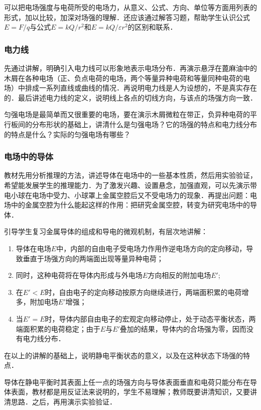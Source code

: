 可以把电场强度与电荷所受的电场力，从意义、公式、方向、单位等方面用列表的形式，加以比较，加深对场强的理解．还应该通过解答习题，帮助学生认识公式$E=F/q$与公式$E=kQ/r^2$和$E=kQ/\varepsilon r^2$的区别和联系．

\subsubsection{电力线}

先通过讲解，明确引入电力线可以形象地表示电场分布．再演示悬浮在蓖麻油中的木屑在各种电场（正、负点电荷的电场，两个等量异种电荷和等量同种电荷的电场）中排成一系列直线或曲线的情况．再说明电力线是人为设想的，不是真实存在的．最后讲述电力线的定义，说明线上各点的切线方向，与该点的场强方向一致．

匀强电场是最简单而又很重要的电场，要在演示木屑微粒在带正，负异种电荷的平行板间的分布形状的基础上，讲清什么是匀强电场？它的场强的特点和电力线分布的特点是什么？实际的匀强电场有哪些？

\subsubsection{电场中的导体}

教材先用分析推理的方法，讲述导体在电场中的一些基本性质，然后用实验验证，希望能发展学生的推理能力．为了激发兴趣、设置悬念，加强直观，可以先演示带电小球在电场中受力、小球罩上金属空腔后又不受电场力的现象．再提出问题：电场中的金属空腔为什么能起这样的作用：把研究金属空腔，转变为研究电场中的导体．

引导学生复习金属导体的组成和导电的微观机制，有层次地讲解：
\begin{enumerate}
\item 导体在电场$E$中，内部的自由电子受电场力作用作逆电场方向的定向移动，导致垂直于场强方向的两端面出现等量异种电荷；
\item 同时，这种电荷将在导体内形成与外电场$E$方向相反的附加电场$E'$;
\item 在$E'<E$时，自由电子的定向移动按原方向继续进行，两端面积累的电荷增多，附加电场$E'$增强；
\item 当$E'=E$时，导体内部自由电子的宏观定向移动停止，处于动态平衡状态，两端面积累的电荷稳定；由于$E$与$E'$叠加的结果，导体内的合场强为零，因而没有电力线分布．
\end{enumerate}
在以上的讲解的基础上，说明静电平衡状态的意义，以及在这种状态下场强的特点．

导体在静电平衡时其表面上任一点的场强方向与导体表面垂直和电荷只能分布在导体表面，教材都是用反证法来说明的，学生不易理解；教师既要讲清知识，又要讲清思路．之后，再用演示实验验证．


